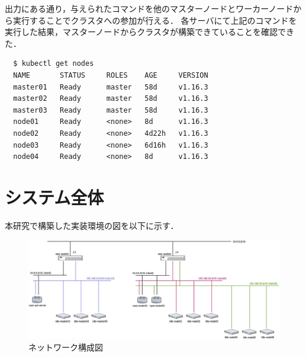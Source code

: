 出力にある通り，与えられたコマンドを他のマスターノードとワーカーノードから実行することでクラスタへの参加が行える．
各サーバにて上記のコマンドを実行した結果，マスターノードからクラスタが構築できていることを確認できた．

\begin{lstlisting}
  $ kubectl get nodes
  NAME       STATUS     ROLES    AGE     VERSION
  master01   Ready      master   58d     v1.16.3
  master02   Ready      master   58d     v1.16.3
  master03   Ready      master   58d     v1.16.3
  node01     Ready      <none>   8d      v1.16.3
  node02     Ready      <none>   4d22h   v1.16.3
  node03     Ready      <none>   6d16h   v1.16.3
  node04     Ready      <none>   8d      v1.16.3
\end{lstlisting}

\section{システム全体}
\label{implementation:system}
本研究で構築した実装環境の図を以下に示す．

\begin{landscape}
  \begin{figure}[htbp]
    \begin{center}
      \includegraphics[width=\textwidth]{./figures/network-diagram.jpg}
      \caption{ネットワーク構成図}
    \end{center}
  \end{figure}
\end{landscape}

